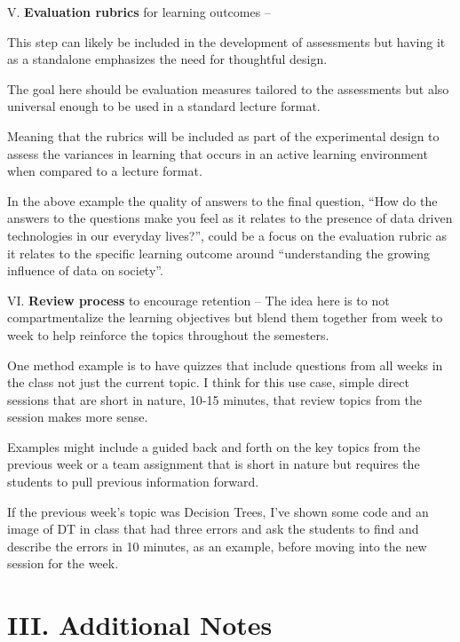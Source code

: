 \documentclass[
  letterpaper,
  DIV=11,
  numbers=noendperiod]{scrreprt}
\begin{document}
V. \textbf{Evaluation rubrics} for learning outcomes --

This step can likely be included in the development of assessments but
having it as a standalone emphasizes the need for thoughtful design.

The goal here should be evaluation measures tailored to the assessments
but also universal enough to be used in a standard lecture format.

Meaning that the rubrics will be included as part of the experimental
design to assess the variances in learning that occurs in an active
learning environment when compared to a lecture format.

In the above example the quality of answers to the final question, ``How
do the answers to the questions make you feel as it relates to the
presence of data driven technologies in our everyday lives?'', could be
a focus on the evaluation rubric as it relates to the specific learning
outcome around ``understanding the growing influence of data on
society''.

VI. \textbf{Review process} to encourage retention -- The idea here is
to not compartmentalize the learning objectives but blend them together
from week to week to help reinforce the topics throughout the semesters.

One method example is to have quizzes that include questions from all
weeks in the class not just the current topic. I think for this use
case, simple direct sessions that are short in nature, 10-15 minutes,
that review topics from the session makes more sense.

Examples might include a guided back and forth on the key topics from
the previous week or a team assignment that is short in nature but
requires the students to pull previous information forward.

If the previous week's topic was Decision Trees, I've shown some code
and an image of DT in class that had three errors and ask the students
to find and describe the errors in 10 minutes, as an example, before
moving into the new session for the week.

\hypertarget{iii.-additional-notes}{%
\section{\texorpdfstring{\textbf{III. Additional
Notes}}{III. Additional Notes}}\label{iii.-additional-notes}}
\end{document}
